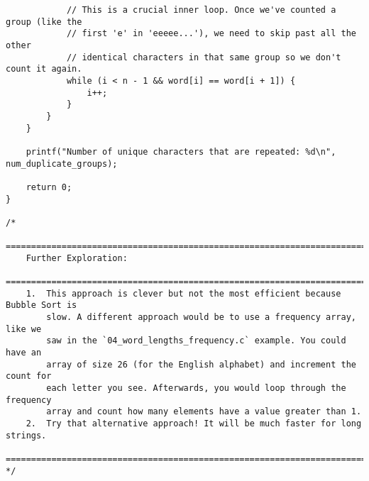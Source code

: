 \documentclass[11pt]{book}
\begin{document}
\begin{verbatim}
            // This is a crucial inner loop. Once we've counted a group (like the
            // first 'e' in 'eeeee...'), we need to skip past all the other
            // identical characters in that same group so we don't count it again.
            while (i < n - 1 && word[i] == word[i + 1]) {
                i++;
            }
        }
    }

    printf("Number of unique characters that are repeated: %d\n", num_duplicate_groups);

    return 0;
}

/*
    ================================================================================
    Further Exploration:
    ================================================================================
    1.  This approach is clever but not the most efficient because Bubble Sort is
        slow. A different approach would be to use a frequency array, like we
        saw in the `04_word_lengths_frequency.c` example. You could have an
        array of size 26 (for the English alphabet) and increment the count for
        each letter you see. Afterwards, you would loop through the frequency
        array and count how many elements have a value greater than 1.
    2.  Try that alternative approach! It will be much faster for long strings.
    ================================================================================
*/

\end{verbatim}
\end{document}
